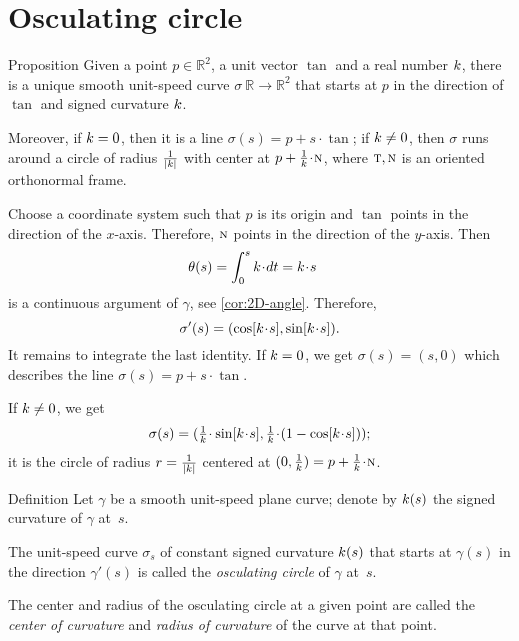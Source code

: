 \section{Osculating circle}

\begin{thm}{Proposition}\label{prop:circline}
Given a point $p\in\mathbb{R}^2$,
a unit vector $\tan$ 
and a real number $k$, there is a unique smooth unit-speed curve $\sigma\:\mathbb{R}\to\mathbb{R}^2$ 
that starts at $p$ in the direction of $\tan$ and signed curvature $k$.

Moreover, if $k=0$, then it is a line $\sigma(s)=p+s\cdot \tan$;
if $k\ne 0$, then $\sigma$ runs around a circle of radius $\tfrac1{|k|}$ with center at $p+\tfrac1\skur\cdot \norm$, where $\text{\sc{t}},\text{\sc{n}}$ is an oriented orthonormal frame.
\end{thm}

Choose a coordinate system such that $p$ is its origin and $\tan$ points in the direction of the $x$-axis.
Therefore, $\text{\sc{n}}$ points in the direction of the $y$-axis.
Then
\begin{align*}\theta(s)&=\int_{0}^s\skur\cdot dt=\skur\cdot s
\end{align*}
is a continuous argument of $\gamma$, see \ref{cor:2D-angle}.
Therefore,
\[\sigma'(s)=(\cos[\skur\cdot s],\sin[\skur\cdot s]).\]
It remains to integrate the last identity.
If $k=0$, we get $\sigma(s)=(s,0)$
which describes the line $\sigma(s)=p+s\cdot \tan$.

If $k\ne 0$, we get
\[\sigma(s)=(\tfrac1\skur\cdot\sin[\skur\cdot s],
\tfrac1\skur\cdot(1-\cos[\skur\cdot s]));\]
it is the circle of radius $r=\tfrac1{|k|}$ centered at $(0,\tfrac1\skur)=p+\tfrac1\skur\cdot\norm$.
\qeds

\begin{thm}{Definition}
Let $\gamma$ be a smooth unit-speed plane curve;
denote by $k(s)$ the signed curvature of $\gamma$ at~$s$.

The unit-speed curve $\sigma_s$ of constant signed curvature $k(s)$ that starts at $\gamma(s)$ in the direction $\gamma'(s)$ is called the \emph{osculating circle} of $\gamma$ at~$s$.

The center and radius of the osculating circle at a given point are called the \emph{center of curvature} and \emph{radius of curvature} of the curve at that point.
\end{thm}

